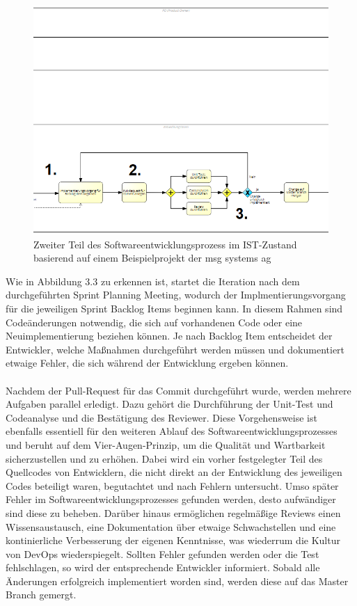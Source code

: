 \begin{figure}[h]
    \centering
    \includegraphics[scale=0.5]{Bilder/IST-Prozess_second Partv2.png}
    \caption{Zweiter Teil des Softwareentwicklungsprozess im IST-Zustand basierend auf einem Beispielprojekt der msg systems ag}
\end{figure}
\newpage
Wie in Abbildung 3.3 zu erkennen ist, startet die Iteration nach dem durchgeführten Sprint Planning Meeting, wodurch der Implmentierungsvorgang für die jeweiligen Sprint Backlog Items beginnen kann. In diesem Rahmen sind Codeänderungen notwendig, die sich auf vorhandenen Code oder eine Neuimplementierung beziehen können. Je nach Backlog Item entscheidet der Entwickler, welche Maßnahmen durchgeführt werden müssen und dokumentiert etwaige Fehler, die sich während der Entwicklung ergeben können.\\\\ Nachdem der Pull-Request für das Commit durchgeführt wurde, werden mehrere Aufgaben parallel erledigt. Dazu gehört die Durchführung der Unit-Test und Codeanalyse und die Bestätigung des Reviewer. Diese Vorgehensweise ist ebenfalls essentiell für den weiteren Ablauf des Softwareentwicklungsprozesses und beruht auf dem Vier-Augen-Prinzip, um die Qualität und Wartbarkeit sicherzustellen und zu erhöhen. Dabei wird ein vorher festgelegter Teil des Quellcodes von Entwicklern, die nicht direkt an der Entwicklung des jeweiligen Codes beteiligt waren, begutachtet und nach Fehlern untersucht. Umso später Fehler im Softwareentwicklungsprozesses gefunden werden, desto aufwändiger sind diese zu beheben. Darüber hinaus ermöglichen regelmäßige Reviews einen Wissensaustausch, eine Dokumentation über etwaige Schwachstellen und eine kontinierliche Verbesserung der eigenen Kenntnisse, was wiederrum die Kultur von DevOps wiederspiegelt. Sollten Fehler gefunden werden oder die Test fehlschlagen, so wird der entsprechende Entwickler informiert. Sobald alle Änderungen erfolgreich implementiert worden sind, werden diese auf das Master Branch gemergt. \\\\
